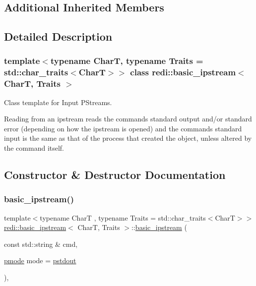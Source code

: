 \subsection*{Additional Inherited Members}


\subsection{Detailed Description}
\subsubsection*{template$<$typename CharT, typename Traits = std\+::char\+\_\+traits$<$\+Char\+T$>$$>$\newline
class redi\+::basic\+\_\+ipstream$<$ Char\+T, Traits $>$}

Class template for Input P\+Streams. 

Reading from an ipstream reads the command\textquotesingle{}s standard output and/or standard error (depending on how the ipstream is opened) and the command\textquotesingle{}s standard input is the same as that of the process that created the object, unless altered by the command itself. 

\subsection{Constructor \& Destructor Documentation}
\mbox{\label{classredi_1_1basic__ipstream_ac9abde4c112c0d8e6680a6e78f9040f9}} 
\subsubsection{\texorpdfstring{basic\+\_\+ipstream()}{basic\_ipstream()}\hspace{0.1cm}{\footnotesize\ttfamily [1/3]}}
{\footnotesize\ttfamily template$<$typename CharT , typename Traits  = std\+::char\+\_\+traits$<$\+Char\+T$>$$>$ \\
\mbox{\hyperlink{classredi_1_1basic__ipstream}{redi\+::basic\+\_\+ipstream}}$<$ CharT, Traits $>$\+::\mbox{\hyperlink{classredi_1_1basic__ipstream}{basic\+\_\+ipstream}} (\begin{DoxyParamCaption}\item[{const std\+::string \&}]{cmd,  }\item[{\mbox{\hyperlink{structredi_1_1pstreams_a1eae4aad88812af03a0fbb3ec13c50b7}{pmode}}}]{mode = {\ttfamily \mbox{\hyperlink{structredi_1_1pstreams_ad3c6d53a98de4566478b1c40c101a42b}{pstdout}}} }\end{DoxyParamCaption})\hspace{0.3cm}{\ttfamily [inline]}, {\ttfamily [explicit]}}



